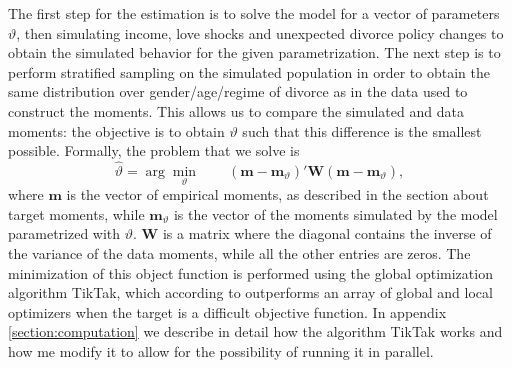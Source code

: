 \documentclass[12pt]{article}
\numberwithin{table}{section}
\begin{document}
The first step for the estimation is to solve the model for a vector of parameters $\vartheta$, then simulating income, love shocks and unexpected divorce policy changes to obtain the simulated behavior for the given parametrization. The next step is to perform stratified sampling on the simulated population in order to obtain the same distribution over gender/age/regime of divorce as in the data used to construct the moments. This allows us to compare the simulated and data moments: the objective is to obtain $\vartheta$ such that this difference is the smallest possible. Formally, the problem that we solve is
\begin{equation}\label{eq:msm}
\hat{\vartheta}=\arg\min_\vartheta \quad\quad (\mathbf{m}-\mathbf{m}_\vartheta)'\mathbf{W}(\mathbf{m}-\mathbf{m}_\vartheta),
\end{equation}
where $\mathbf{m}$ is the vector of empirical moments, as described in the section about target moments, while $\mathbf{m}_\vartheta$ is the vector of the moments simulated by the model parametrized with $\vartheta$. $\mathbf{W}$ is a matrix where the diagonal contains the inverse of the variance of the data moments, while all the other entries are zeros. The minimization of this object function is performed using the global optimization algorithm TikTak, which according to \cite{arnoud2019} outperforms an array of global and local optimizers when the target is a difficult objective function. In appendix \ref{section:computation} we describe in detail how the algorithm TikTak works and how me modify it to allow for the possibility of running it in parallel.
\end{document}
